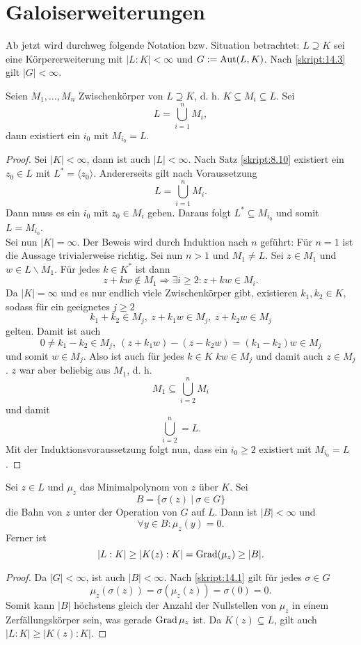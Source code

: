 \section{Galoiserweiterungen}

Ab jetzt wird durchweg folgende Notation bzw. Situation betrachtet: $L\supseteq K$ sei eine Körpererweiterung mit $|L:K|<\infty$ und $G:=\operatorname{Aut}(L,K)$. Nach \ref{skript:14.3} gilt $|G|<\infty$.

\begin{lemma}\label{skript:15.1}
	Seien $M_1,\ldots,M_n$ Zwischenkörper von $L\supseteq K$, d. h. $K\subseteq M_i\subseteq L$. Sei
	\[L=\bigcup_{i=1}^n M_i,\]
	dann existiert ein $i_0$ mit $M_{i_0}=L$.
\end{lemma}
\begin{proof}
	Sei $|K|<\infty$, dann ist auch $|L|<\infty$. Nach Satz \ref{skript:8.10} existiert ein $z_0\in L$ mit $L^\ast=\langle z_0\rangle$. Andererseits gilt nach Voraussetzung
	\[L=\bigcup_{i=1}^n M_i.\]
	Dann muss es ein $i_0$ mit $z_0\in M_i$ geben. Daraus folgt $L^\ast\subseteq M_{i_0}$ und somit $L=M_{i_0}$.\\
	Sei nun $|K|=\infty$. Der Beweis wird durch Induktion nach $n$ geführt: Für $n=1$ ist die Aussage trivialerweise richtig. Sei nun $n>1$ und $M_1\neq L$. Sei $z\in M_1$ und $w\in L\backslash M_1$. Für jedes $k\in K^\ast$ ist dann
	\[z+kw\notin M_1\Rightarrow\exists i\geq2: z+kw\in M_i.\]
	Da $|K|=\infty$ und es nur endlich viele Zwischenkörper gibt, existieren $k_1,k_2\in K$, sodass für ein geeignetes $j\geq2$
	\[k_1+k_2\in M_j,\ z+k_1w\in M_j,\ z+k_2w\in M_j\]
	gelten. Damit ist auch
	\[0\neq k_1-k_2\in M_j,\ (z+k_1w)-(z-k_2w)=(k_1-k_2)w\in M_j\]
	und somit $w\in M_j$. Also ist auch für jedes $k\in K$ $kw\in M_j$ und damit auch $z\in M_j$. $z$ war aber beliebig aus $M_1$, d. h.
	\[M_1\subseteq\bigcup_{i=2}^n M_i\]
	und damit
	\[\bigcup_{i=2}^n=L.\]
	Mit der Induktionsvoraussetzung folgt nun, dass ein $i_0\geq 2$ existiert mit $M_{i_0}=L$.
\end{proof}

\begin{lemma}\label{skript:15.2}
	Sei $z\in L$ und $\mu_z$ das Minimalpolynom von $z$ über $K$. Sei
	\[B=\{\sigma(z)\ |\ \sigma\in G\}\]
	die Bahn von $z$ unter der Operation von $G$ auf $L$. Dann ist $|B|<\infty$ und
	\[\forall y\in B: \mu_z(y)=0.\]
	Ferner ist
	\[|L:K|\geq|K(z):K|=\operatorname{Grad}(\mu_z)\geq |B|.\]
\end{lemma}
\begin{proof}
	Da $|G|<\infty$, ist auch $|B|<\infty$. Nach \ref{skript:14.1} gilt für jedes $\sigma\in G$
	\[\mu_z(\sigma(z))=\sigma(\mu_z(z))=\sigma(0)=0.\]
	Somit kann $|B|$ höchstens gleich der Anzahl der Nullstellen von $\mu_z$ in einem Zerfällungskörper sein, was gerade $\operatorname{Grad} \mu_z$ ist. Da $K(z)\subseteq L$, gilt auch $|L:K|\geq|K(z):K|$.
\end{proof}

